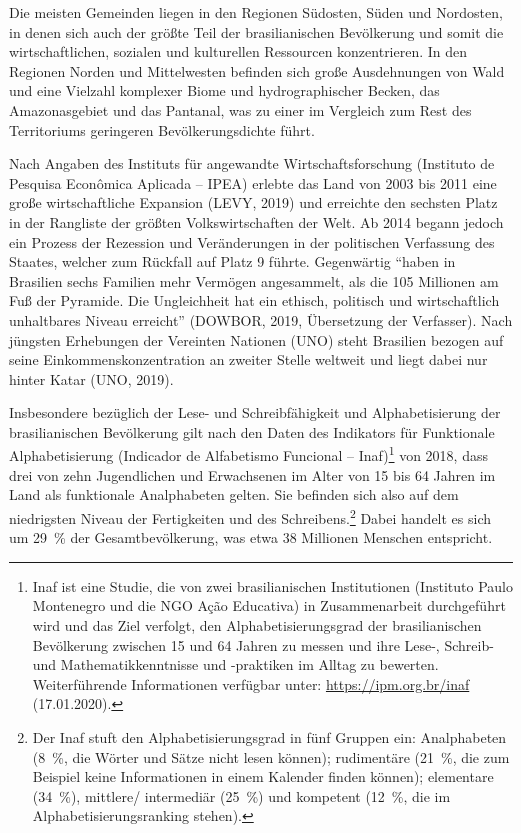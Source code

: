 \documentclass[a4paper,
fontsize=11pt,
oneside,
numbers=noperiodatend,
parskip=half-,
bibliography=totoc,
final
]{scrartcl}
\begin{document}
Die meisten Gemeinden liegen in den Regionen Südosten, Süden und
Nordosten, in denen sich auch der größte Teil der brasilianischen
Bevölkerung und somit die wirtschaftlichen, sozialen und kulturellen
Ressourcen konzentrieren. In den Regionen Norden und Mittelwesten
befinden sich große Ausdehnungen von Wald und eine Vielzahl komplexer
Biome und hydrographischer Becken, das Amazonasgebiet und das Pantanal,
was zu einer im Vergleich zum Rest des Territoriums geringeren
Bevölkerungsdichte führt.

Nach Angaben des Instituts für angewandte Wirtschaftsforschung
(Instituto de Pesquisa Econômica Aplicada -- IPEA) erlebte das Land von
2003 bis 2011 eine große wirtschaftliche Expansion (LEVY, 2019) und
erreichte den sechsten Platz in der Rangliste der größten
Volkswirtschaften der Welt. Ab 2014 begann jedoch ein Prozess der
Rezession und Veränderungen in der politischen Verfassung des Staates,
welcher zum Rückfall auf Platz 9 führte. Gegenwärtig \enquote{haben in
Brasilien sechs Familien mehr Vermögen angesammelt, als die 105
Millionen am Fuß der Pyramide. Die Ungleichheit hat ein ethisch,
politisch und wirtschaftlich unhaltbares Niveau erreicht} (DOWBOR, 2019,
Übersetzung der Verfasser). Nach jüngsten Erhebungen der Vereinten
Nationen (UNO) steht Brasilien bezogen auf seine Einkommenskonzentration
an zweiter Stelle weltweit und liegt dabei nur hinter Katar (UNO, 2019).

Insbesondere bezüglich der Lese- und Schreibfähigkeit und
Alphabetisierung der brasilianischen Bevölkerung gilt nach den Daten des
Indikators für Funktionale Alphabetisierung (Indicador de Alfabetismo
Funcional -- Inaf)\footnote{Inaf ist eine Studie, die von zwei
  brasilianischen Institutionen (Instituto Paulo Montenegro und die NGO
  Ação Educativa) in Zusammenarbeit durchgeführt wird und das Ziel
  verfolgt, den Alphabetisierungsgrad der brasilianischen Bevölkerung
  zwischen 15 und 64 Jahren zu messen und ihre Lese-, Schreib- und
  Mathematikkenntnisse und -praktiken im Alltag zu bewerten.
  Weiterführende Informationen verfügbar unter:
  \url{https://ipm.org.br/inaf} (17.01.2020).} von 2018, dass drei von
zehn Jugendlichen und Erwachsenen im Alter von 15 bis 64 Jahren im Land
als funktionale Analphabeten gelten. Sie befinden sich also auf dem
niedrigsten Niveau der Fertigkeiten und des Schreibens.\footnote{Der
  Inaf stuft den Alphabetisierungsgrad in fünf Gruppen ein: Analphabeten
  (8~\%, die Wörter und Sätze nicht lesen können); rudimentäre (21~\%,
  die zum Beispiel keine Informationen in einem Kalender finden können);
  elementare (34~\%), mittlere/ intermediär (25~\%) und kompetent
  (12~\%, die im Alphabetisierungsranking stehen).} Dabei handelt es
sich um 29~\% der Gesamtbevölkerung, was etwa 38 Millionen Menschen
entspricht.
\end{document}
